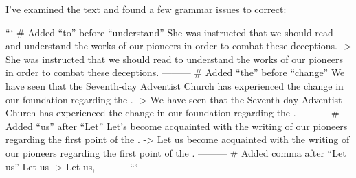 I've examined the text and found a few grammar issues to correct:

```
# Added “to” before “understand”
She was instructed that we should read and understand the works of our pioneers in order to combat these deceptions.
->
She was instructed that we should read to understand the works of our pioneers in order to combat these deceptions.
---------
# Added “the” before “change”
We have seen that the Seventh-day Adventist Church has experienced the change in our foundation regarding the .
->
We have seen that the Seventh-day Adventist Church has experienced the change in our foundation regarding the .
---------
# Added “us” after “Let”
Let's become acquainted with the writing of our pioneers regarding the first point of the .
->
Let us become acquainted with the writing of our pioneers regarding the first point of the .
---------
# Added comma after “Let us”
Let us
->
Let us, 
---------
```